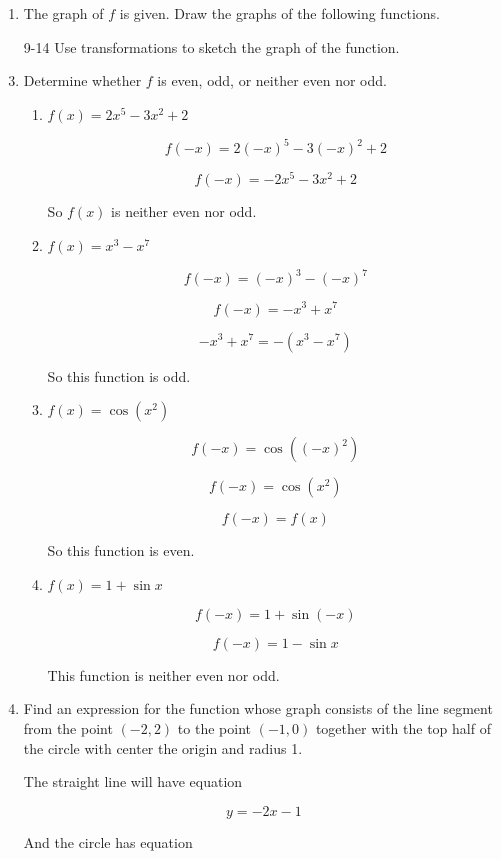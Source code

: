 \documentclass{article}
\begin{document}
\begin{enumerate}
\begin{enumerate}
	\end{enumerate}

	\item The graph of $f$ is given. Draw the graphs of the following functions.

	\item[9-14] Use transformations to sketch the graph of the function.

	\item Determine whether $f$ is even, odd, or neither even nor odd.

	\begin{enumerate}
		\item $f(x) = 2x^5 - 3x^2 + 2$

		$$f(-x) = 2(-x)^5 - 3(-x)^2 + 2$$

		$$f(-x) = -2x^5 - 3x^2 + 2$$

		So $f(x)$ is neither even nor odd.

		\item $f(x) =  x^3 - x^7$

		$$f(-x) = (-x)^3 - (-x)^7$$

		$$f(-x) = -x^3 + x^7$$

		$$-x^3 + x^7 = -(x^3 - x^7)$$

		So this function is odd.

		\item $f(x) = \cos(x^2)$

		$$f(-x) = \cos((-x)^2)$$

		$$f(-x) = \cos(x^2)$$

		$$f(-x) = f(x)$$

		So this function is even.

		\item $f(x) = 1 + \sin x$

		$$f(-x) = 1 + \sin(-x)$$

		$$f(-x) = 1 - \sin x$$

		This function is neither even nor odd.
	\end{enumerate}

	\item Find an expression for the function whose graph consists of the
		line segment from the point $(-2,2)$ to the point $(-1, 0)$
		together with the top half of the circle with center the origin
		and radius 1.

		The straight line will have equation

		$$y = -2x - 1$$

		And the circle has equation


\end{enumerate}
\end{document}
